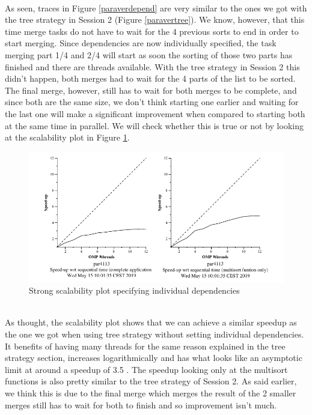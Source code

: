 \documentclass[12]{article}
\begin{document}
\\
As seen, traces in Figure \ref{paraverdepend} are very similar to the ones we got with the tree strategy in Session 2 (Figure \ref{paravertree}). We know, however, that this time merge tasks do not have to wait for the 4 previous sorts to end in order to start merging. Since dependencies are now individually specified, the task merging part 1/4 and 2/4 will start as soon the sorting of those two parts has finished and there are threads available. With the tree strategy in Session 2 this didn't happen, both merges had to wait for the 4 parts of the list to be sorted. The final merge, however, still has to wait for both merges to be complete, and since both are the same size, we don't think starting one earlier and waiting for the last one will make a significant improvement when compared to starting both at the same time in parallel. We will check whether this is true or not by looking at the scalability plot in Figure \ref{strongdepend}.
\\
\medskip
\begin{figure}[H]
    \centering
    \includegraphics[scale=0.75]{images/dependStrong.PNG}
    \caption{Strong scalability plot specifying individual dependencies}
    \label{strongdepend}
\end{figure}
\\
As thought, the scalability plot shows that we can achieve a similar speedup as the one we got when using tree strategy without setting individual dependencies. It benefits of having many threads for the same reason explained in the tree strategy section, increases logarithmically and has what looks like an asymptotic limit at around a speedup of 3.5 . The speedup looking only at the multisort functions is also pretty similar to the tree strategy of Session 2. As said earlier, we think this is due to the final merge which merges the result of the 2 smaller merges still has to wait for both to finish and so improvement isn't much.
\end{document}
